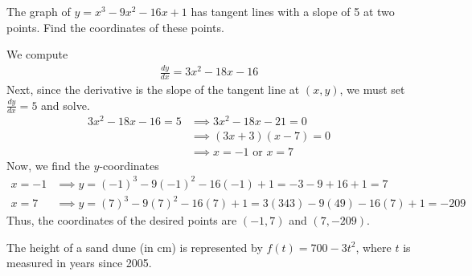 \documentclass[11pt]{exam}
\begin{document}
\vspace{2.5em}
\begin{questions}
  \question The graph of $y=x^3-9x^2-16x+1$ has tangent lines with a
    slope of 5 at two points.  Find the coordinates of these points.
    \begin{solution}
      We compute
      \begin{align*}
        \frac{dy}{dx} = 3x^2-18x-16
      \end{align*}
      Next, since the derivative is the slope of the tangent line at
      \((x,y)\), we must set \(\frac{dy}{dx}=5\) and solve.
      \begin{align*}
        3x^2-18x-16=5
        & \implies 3x^2-18x-21 = 0\\
        & \implies (3x+3)(x-7) = 0\\
        & \implies x=-1 \text{ or }x=7
      \end{align*}
      Now, we find the \(y\)-coordinates
      \begin{align*}
        x = -1
        & \implies y = (-1)^3-9(-1)^2-16(-1)+1 = -3-9+16+1 = 7\\
        x = 7
        & \implies y = (7)^3-9(7)^2-16(7)+1 = 3(343) - 9(49) -
          16(7)+1 = -209
      \end{align*}
      Thus, the coordinates of the desired points are \((-1,7)\) and \((7,-209)\).
    \end{solution}
  \question The height of a sand dune (in cm) is represented by
    $f(t)=700-3t^2$, where $t$ is measured in years since 2005.
\end{questions}
\end{document}
